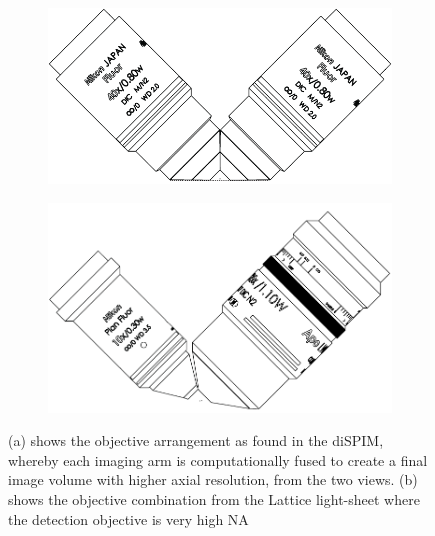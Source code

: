 \begin{figure}
    \centering
    \begin{subfigure}[b]{0.45\linewidth}
    \centering
    \includegraphics[width=0.9\linewidth]{./matched_objectives}
    \caption{}
    \end{subfigure}
    \begin{subfigure}[b]{0.45\linewidth}
        \centering
        \includegraphics[width=0.9\linewidth]{./assymetric_nikon}
        \caption{}
    \end{subfigure}
    \caption{
    (a) shows the objective arrangement as found in the \gls{diSPIM}, whereby each imaging arm is computationally fused to create a final image volume with higher axial resolution, from the two views.
    (b) shows the objective combination from the Lattice light-sheet where the detection objective is very high NA
    }
    \label{}
\end{figure}
